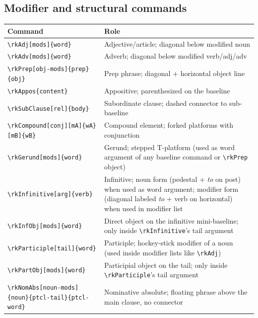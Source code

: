 \documentclass[11pt]{article}
\newcommand{\cmd}[1]{\texttt{\textbackslash #1}}
\begin{document}
\subsection*{Modifier and structural commands}

\medskip
\begin{tabular}{@{}p{7cm}p{8cm}@{}}
  \toprule
  Command & Role \\
  \midrule
  \cmd{rkAdj[mods]\{word\}}                             & Adjective/article; diagonal below modified noun \\
  \cmd{rkAdv[mods]\{word\}}                             & Adverb; diagonal below modified verb/adj/adv \\
  \cmd{rkPrep[obj-mods]\{prep\}\{obj\}}                 & Prep phrase; diagonal + horizontal object line \\
  \cmd{rkAppos\{content\}}                              & Appositive; parenthesized on the baseline \\
  \cmd{rkSubClause[rel]\{body\}}                        & Subordinate clause; dashed connector to sub-baseline \\
  \cmd{rkCompound[conj][mA]\{wA\}[mB]\{wB\}}           & Compound element; forked platforms with conjunction \\
  \cmd{rkGerund[mods]\{word\}}                          & Gerund; stepped T-platform (used as word argument of any baseline command or \cmd{rkPrep} object) \\
  \cmd{rkInfinitive[arg]\{verb\}}                       & Infinitive; noun form (pedestal + \emph{to} on post) when used as word argument; modifier form (diagonal labeled \emph{to} + verb on horizontal) when used in modifier list \\
  \cmd{rkInfObj[mods]\{word\}}                          & Direct object on the infinitive mini-baseline; only inside \cmd{rkInfinitive}'s tail argument \\
  \cmd{rkParticiple[tail]\{word\}}                      & Participle; hockey-stick modifier of a noun (used inside modifier lists like \cmd{rkAdj}) \\
  \cmd{rkPartObj[mods]\{word\}}                         & Participial object on the tail; only inside \cmd{rkParticiple}'s tail argument \\
  \cmd{rkNomAbs[noun-mods]\{noun\}\{ptcl-tail\}\{ptcl-word\}} & Nominative absolute; floating phrase above the main clause, no connector \\
  \bottomrule
\end{tabular}
\end{document}

